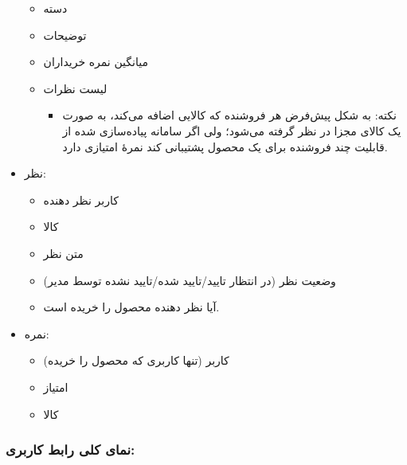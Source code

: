 \documentclass[]{article}
\begin{document}
\begin{itemize}
\begin{itemize}
\item
دسته

\item
توضیحات

\item
میانگین نمره خریداران

\item
لیست نظرات

\begin{itemize}[label = $\blacksquare$]
\item
نکته: به شکل پیش‌فرض هر فروشنده که کالایی اضافه می‌کند، به صورت یک کالای مجزا در نظر گرفته می‌شود؛ ولی اگر سامانه پیاده‌سازی شده از قابلیت چند فروشنده برای یک محصول پشتیبانی کند نمرهٔ امتیازی دارد.
\end{itemize}

\end{itemize}
\newpage
\item
نظر:

\begin{itemize}
\item
کاربر نظر دهنده

\item
کالا

\item
متن نظر

\item
وضعیت نظر (در انتظار تایید/تایید شده/تایید نشده توسط مدیر)

\item
آیا نظر دهنده محصول را خریده است.

\end{itemize}

\item
نمره:

\begin{itemize}

\item
کاربر (تنها کاربری که محصول را خریده)

\item
امتیاز

\item
کالا

\end{itemize}


\end{itemize}


\subsubsection*{{\titr نمای کلی رابط کاربری:}}
\end{document}
